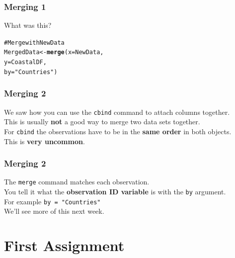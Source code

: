 \documentclass{beamer}\usepackage{graphicx, color}
\makeatletter
\newcommand{\hlfunctioncall}[1]{\textcolor[rgb]{0.501960784313725,0,0.329411764705882}{\textbf{#1}}}%
\newcommand{\hlstring}[1]{\textcolor[rgb]{0.6,0.6,1}{#1}}%
\newcommand{\hlcomment}[1]{\textcolor[rgb]{0.180392156862745,0.6,0.341176470588235}{#1}}%
\newenvironment{kframe}{%
 \def\at@end@of@kframe{}%
 \ifinner\ifhmode%
  \def\at@end@of@kframe{\end{minipage}}%
  \begin{minipage}{\columnwidth}%
 \fi\fi%
 \def\FrameCommand##1{\hskip\@totalleftmargin \hskip-\fboxsep
 \colorbox{shadecolor}{##1}\hskip-\fboxsep
     \hskip-\linewidth \hskip-\@totalleftmargin \hskip\columnwidth}%
 \MakeFramed {\advance\hsize-\width
   \@totalleftmargin\z@ \linewidth\hsize
   \@setminipage}}%
 {\par\unskip\endMakeFramed%
 \at@end@of@kframe}
\newenvironment{knitrout}{}{} %
\makeatother
\begin{document}
\begin{frame}[fragile]
  \frametitle{Merging 1}
  What was this?
\begin{knitrout}
\color{fgcolor}\begin{kframe}
\begin{alltt}
\hlcomment{# Merge with NewData}
MergedData <- \hlfunctioncall{merge}(x = NewData, 
                    y = CoastalDF, 
                    by = \hlstring{"Countries"})
\end{alltt}
\end{kframe}
\end{knitrout}

\end{frame}

\begin{frame}[fragile]
  \frametitle{Merging 2}
  We saw how you can use the \texttt{cbind} command to attach columns together. \\[0.5cm]
  This is usually {\bf{not}} a good way to merge two data sets together. \\[0.5cm]
  For \texttt{cbind} the observations have to be in the {\bf{same order}} in both objects. \\[0.5cm]
  This is {\bf{very uncommon}}.
\end{frame}

\begin{frame}[fragile]
  \frametitle{Merging 2}
  The \texttt{merge} command matches each observation.\\[0.5cm]
  You tell it what the {\bf{observation ID variable}} is with the \texttt{by} argument.\\[0.25cm]
  For example \texttt{by = "Countries"} \\[0.5cm]
  We'll see more of this next week.
\end{frame}


\section{First Assignment}
\end{document}
